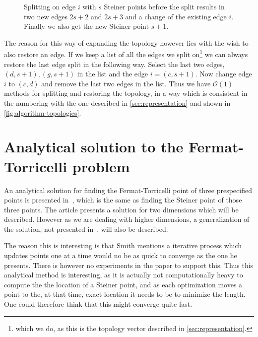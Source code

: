 \begin{figure}[htbp]
  \centering
  
  \caption[Implementation of topology splitting]{Splitting on edge $i$ with $s$ Steiner points before the
    split results in two new edges $2s+2$ and $2s+3$ and a change of the existing edge $i$. Finally we
  also get the new Steiner point $s + 1$.\label{fig:splitting-topology}}
\end{figure}

The reason for this way of expanding the topology however lies with the wish to
also restore an edge. If we keep a list of all the edges we split
on\footnote{which we do, as this is the topology vector described in
  \cref{sec:representation}.} we can always restore the last edge split in the
following way. Select the last two edges, $(d, s+1), (g, s+1)$ in the list and
the edge $i = (c, s+1)$. Now change edge $i$ to $(c, d)$ and remove the last
two edges in the list. Thus we have $\mathcal{O}(1)$ methods for splitting and
restoring the topology, in a way which is consistent in the numbering with the
one described in \cref{sec:representation} and shown in
\cref{fig:algorithm-topologies}.


\section{Analytical solution to the Fermat-Torricelli problem}
\label{sec:analyt-solut-ferm}

An analytical solution for finding the Fermat-Torricelli point of three
prespecified points is presented in~\cite{uteshev2012}, which is the same as
finding the Steiner point of those three points. The article presents a
solution for two dimensions which will be described. However as we are dealing
with  higher dimensions, a generalization of the solution, not presented
in~\cite{uteshev2014}, will also be described.

The reason this is interesting is that Smith mentions a iterative process which
updates points one at a time would no be as quick to converge as the one he
presents. There is however no experiments in the paper to support this. Thus
this analytical method is interesting, as it is actually not computationally
heavy to compute the the location of a Steiner point, and as each optimization
moves a point to the, at that time, exact location it needs to be to minimize
the length. One could therefore think that this might converge quite fast.

